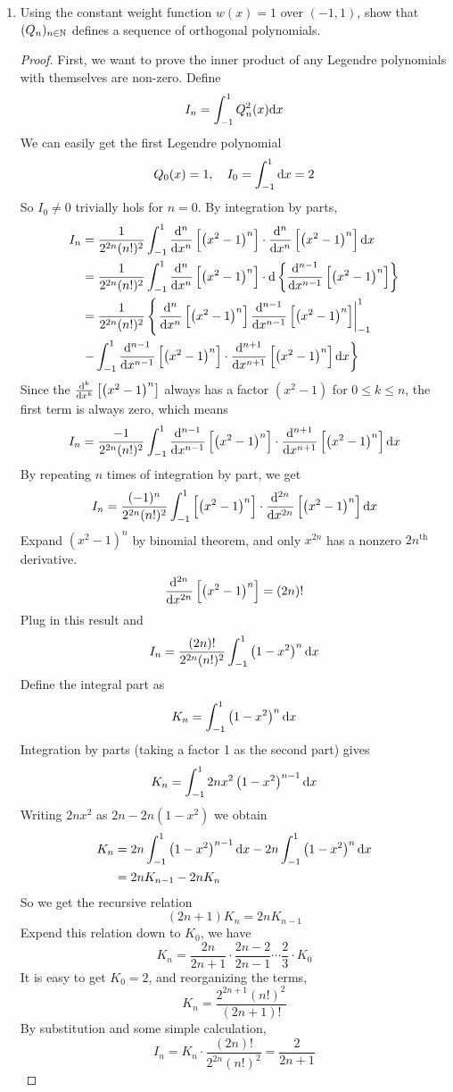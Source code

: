 \begin{enumerate}
	\item Using the constant weight function \(w(x) = 1\) over \((-1, 1)\), show that \((Q_n)_{n\in\mathbb{N}}\) defines a sequence of orthogonal polynomials.
	\begin{proof}
	First, we want to prove the inner product of any Legendre polynomials with themselves are non-zero.
	Define
	\[ I_n=\int_{-1}^{1}Q_n^2(x)\mathrm{d} x \]
	We can easily get the first Legendre polynomial
	\[ Q_0(x)=1, \quad I_0=\int_{-1}^{1}\mathrm{d} x=2 \]
	So \(I_0\neq0\) trivially hols for \(n=0\).
	By integration by parts,
	\begin{align*}
	I_n&=\frac{1}{2^{2n}(n!)^2} \int_{-1}^{1} \frac{\mathrm{d}^{n}}{\mathrm{d}{x}^{n}}\left[\left(x^2-1\right)^n \right] \cdot \frac{\mathrm{d}^{n}}{\mathrm{d}{x}^{n}}\left[\left(x^2-1\right)^n \right] \mathrm{d} x\\
	&=\frac{1}{2^{2n}(n!)^2} \int_{-1}^{1} \frac{\mathrm{d}^{n}}{\mathrm{d}{x}^{n}}\left[\left(x^2-1\right)^n \right] \cdot \mathrm{d} \left\{\frac{\mathrm{d}^{n-1}}{\mathrm{d}{x}^{n-1}}\left[\left(x^2-1\right)^n \right]\right\}\\
	&=\frac{1}{2^{2n}(n!)^2} \left\{ \left.\frac{\mathrm{d}^{n}}{\mathrm{d}{x}^{n}}\left[\left(x^2-1\right)^n \right]\frac{\mathrm{d}^{n-1}}{\mathrm{d}{x}^{n-1}}\left[\left(x^2-1\right)^n \right]\right|_{-1}^{1}\right. \\
	& \left. - \int_{-1}^{1} \frac{\mathrm{d}^{n-1}}{\mathrm{d}{x}^{n-1}}\left[\left(x^2-1\right)^n \right] \cdot \frac{\mathrm{d}^{n+1}}{\mathrm{d}{x}^{n+1}}\left[\left(x^2-1\right)^n \right] \mathrm{d} x \right\}
	\end{align*}
	Since the \(\frac{\mathrm{d}^{k}}{\mathrm{d}{x}^{k}}\left[\left(x^2-1\right)^n \right]\) always has a factor \(\left(x^2-1\right)\) for \(0\leq k\leq n\), the first term is always zero, which means
	\[ I_n=\frac{-1}{2^{2n}(n!)^2} \int_{-1}^{1} \frac{\mathrm{d}^{n-1}}{\mathrm{d}{x}^{n-1}}\left[\left(x^2-1\right)^n \right] \cdot \frac{\mathrm{d}^{n+1}}{\mathrm{d}{x}^{n+1}}\left[\left(x^2-1\right)^n \right] \mathrm{d} x \]
	By repeating $n$ times of integration by part, we get
	\[ I_n=\frac{(-1)^n}{2^{2n}(n!)^2} \int_{-1}^{1} \left[\left(x^2-1\right)^n \right] \cdot \frac{\mathrm{d}^{2n}}{\mathrm{d}{x}^{2n}}\left[\left(x^2-1\right)^n \right] \mathrm{d} x \]
	Expand \(\left(x^2-1\right)^n\) by binomial theorem, and only \(x^{2n}\) has a nonzero \(2n^\textrm{th}\) derivative.
	\[ \frac{\mathrm{d}^{2n}}{\mathrm{d}{x}^{2n}}\left[\left(x^2-1\right)^n \right]=(2n)! \]
	Plug in this result and
	\[ I_n=\frac{(2n)!}{2^{2n}(n!)^2} \int_{-1}^{1} \left(1-x^2\right)^n \mathrm{d} x \]
	Define the integral part as
	\[ K_n=\int_{-1}^{1} \left(1-x^2\right)^n \mathrm{d} x \]
	Integration by parts (taking a factor 1 as the second part) gives
	\[ K_n=\int_{-1}^{1} 2nx^2\left(1-x^2\right)^{n-1}\mathrm{d} x \]
	Writing \(2nx^2\) as \(2n-2n\left(1-x^2\right)\) we obtain
	\begin{align*}
	K_n&=2n\int_{-1}^{1} \left(1-x^2\right)^{n-1} \mathrm{d} x -2n\int_{-1}^{1} \left(1-x^2\right)^n \mathrm{d} x\\
	&=2n K_{n-1} -2n K_{n}
	\end{align*}
	So we get the recursive relation
	\[ (2n+1)K_n = 2n K_{n-1} \]
	Expend this relation down to $K_0$, we have
	\[ K_n=\frac{2n}{2n+1}\cdot\frac{2n-2}{2n-1}\cdots\frac{2}{3}\cdot K_0 \]
	It is easy to get \(K_0=2\), and reorganizing the terms,
	\[ K_n=\frac{2^{2n+1}(n!)^2}{(2n+1)!} \]
	By substitution and some simple calculation,
	\[ I_n=K_n\cdot\frac{(2n)!}{2^{2n}(n!)^2}=\frac{2}{2n+1} \]


\end{proof}
\end{enumerate}
